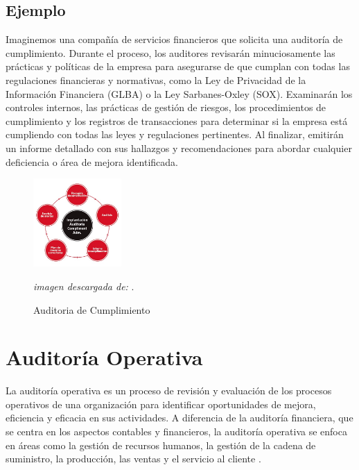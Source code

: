 \documentclass[12pt,a4paper]{article}
\begin{document}
\subsection*{Ejemplo}
Imaginemos una compañía de servicios financieros que solicita una auditoría de cumplimiento. Durante el proceso, los auditores revisarán minuciosamente las prácticas y políticas de la empresa para asegurarse de que cumplan con todas las regulaciones financieras y normativas, como la Ley de Privacidad de la Información Financiera (GLBA) o la Ley Sarbanes-Oxley (SOX). Examinarán los controles internos, las prácticas de gestión de riesgos, los procedimientos de cumplimiento y los registros de transacciones para determinar si la empresa está cumpliendo con todas las leyes y regulaciones pertinentes. Al finalizar, emitirán un informe detallado con sus hallazgos y recomendaciones para abordar cualquier deficiencia o área de mejora identificada.


\begin{figure}[!htb]
    \centering
    \caption{Auditoria de Cumplimiento} 

    \includegraphics[width=0.3\textwidth]{images/fig_cumplimiento.jpg}
    \par
    \textit{imagen descargada de:} \cite{fig_cumplimiento}.

\end{figure}


\newpage
\section{Auditoría Operativa} 
La auditoría operativa es un proceso de revisión y evaluación de los procesos operativos de una organización para identificar oportunidades de mejora, eficiencia y eficacia en sus actividades. A diferencia de la auditoría financiera, que se centra en los aspectos contables y financieros, la auditoría operativa se enfoca en áreas como la gestión de recursos humanos, la gestión de la cadena de suministro, la producción, las ventas y el servicio al cliente
\cite{audit_operativa}.
\end{document}
